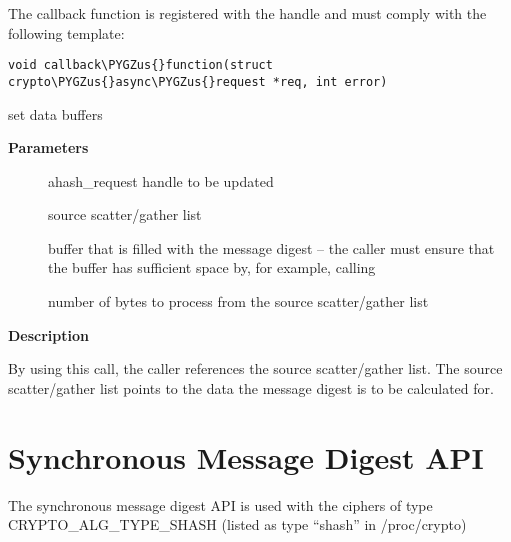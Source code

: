 \documentclass[a4paper,8pt,english]{sphinxmanual}
\def\PYGZus{\char`\_}
\begin{document}
The callback function is registered with the  handle and
must comply with the following template:

\begin{Verbatim}[commandchars=\\\{\}]
void callback\PYGZus{}function(struct crypto\PYGZus{}async\PYGZus{}request *req, int error)
\end{Verbatim}

\begin{fulllineitems}
\label{crypto/api-digest:c.ahash_request_set_crypt}
set data buffers

\end{fulllineitems}


\textbf{Parameters}
\begin{description}
\item[{}] \leavevmode
ahash\_request handle to be updated

\item[{}] \leavevmode
source scatter/gather list

\item[{}] \leavevmode
buffer that is filled with the message digest -- the caller must
ensure that the buffer has sufficient space by, for example, calling
{\hyperref[crypto/api\string-digest:c.crypto_ahash_digestsize]{}}

\item[{}] \leavevmode
number of bytes to process from the source scatter/gather list

\end{description}

\textbf{Description}

By using this call, the caller references the source scatter/gather list.
The source scatter/gather list points to the data the message digest is to
be calculated for.


\section{Synchronous Message Digest API}
\label{crypto/api-digest:synchronous-message-digest-api}
The synchronous message digest API is used with the ciphers of type
CRYPTO\_ALG\_TYPE\_SHASH (listed as type ``shash'' in /proc/crypto)
\end{document}
